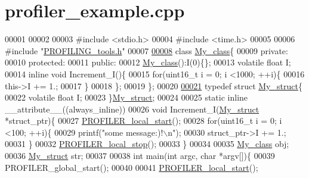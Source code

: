 \hypertarget{profiler__example_8cpp_source}{\section{profiler\-\_\-example.\-cpp}
}

\begin{DoxyCode}
00001 
00002 
00003 \textcolor{preprocessor}{#include <stdio.h>}
00004 \textcolor{preprocessor}{#include <time.h>}
00005 
00006 \textcolor{preprocessor}{#include "\hyperlink{_p_r_o_f_i_l_i_n_g__tools_8h}{PROFILING_tools.h}"}
00007 
\hypertarget{profiler__example_8cpp_source_l00008}{}\hyperlink{class_my__class}{00008} \textcolor{keyword}{class }\hyperlink{class_my__class}{My_class}\{
00009 \textcolor{keyword}{private}:
00010 \textcolor{keyword}{protected}:      
00011 \textcolor{keyword}{public}:
00012         \hyperlink{class_my__class}{My_class}():I(0)\{\};
00013         \textcolor{keyword}{volatile} \textcolor{keywordtype}{float} I;
00014         \textcolor{keyword}{inline} \textcolor{keywordtype}{void} Increment\_I()\{
00015                 \textcolor{keywordflow}{for}(uint16\_t i = 0; i <1000; ++i)\{
00016                         this->I += 1.;
00017                 \}
00018         \};
00019 \};
00020 
\hypertarget{profiler__example_8cpp_source_l00021}{}\hyperlink{struct_my__struct}{00021} \textcolor{keyword}{typedef} \textcolor{keyword}{struct }\hyperlink{struct_my__struct}{My_struct}\{
00022         \textcolor{keyword}{volatile} \textcolor{keywordtype}{float} I;
00023 \}\hyperlink{struct_my__struct}{My_struct};
00024 
00025 \textcolor{keyword}{static} \textcolor{keyword}{inline} \_\_attribute\_\_((always\_inline))
00026 void Increment\_I(\hyperlink{struct_my__struct}{My_struct} *struct\_ptr)\{
00027     \hyperlink{_p_r_o_f_i_l_i_n_g__tools_8h_a632f3afa2c72dd938e2a5d7e9c1e202e}{PROFILER_local_start}();
00028         \textcolor{keywordflow}{for}(uint16\_t i = 0; i <100; ++i)\{
00029                 printf(\textcolor{stringliteral}{"some message:)!\(\backslash\)n"});
00030                 struct\_ptr->I += 1.;
00031     \}
00032     \hyperlink{_p_r_o_f_i_l_i_n_g__tools_8h_ad8354a6502e89adea8535f4029a15b5f}{PROFILER_local_stop}();
00033 \}
00034 
00035 \hyperlink{class_my__class}{My_class} obj;
00036 \hyperlink{struct_my__struct}{My_struct} str;
00037 
00038 \textcolor{keywordtype}{int} main(\textcolor{keywordtype}{int} argc, \textcolor{keywordtype}{char} *argv[])\{
00039         PROFILER\_global\_start();
00040         
00041     \hyperlink{_p_r_o_f_i_l_i_n_g__tools_8h_a632f3afa2c72dd938e2a5d7e9c1e202e}{PROFILER_local_start}();

\end{DoxyCode}

